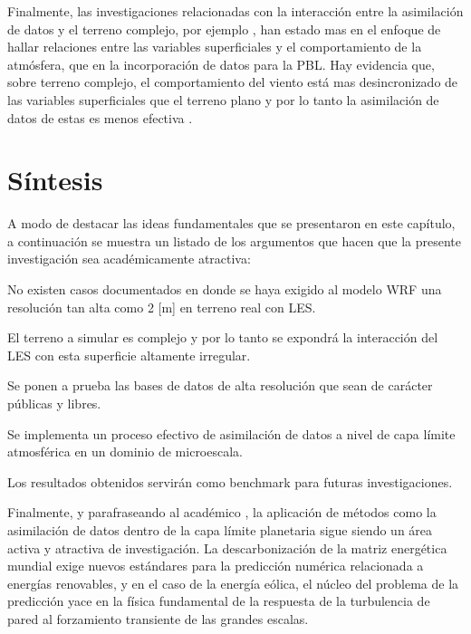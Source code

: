 Finalmente, las investigaciones relacionadas con la interacción entre la asimilación de datos y el terreno complejo, por ejemplo  \cite{hacker2018challenges}, han estado mas en el enfoque de hallar relaciones entre las variables superficiales y el comportamiento de la atmósfera, que en la incorporación de datos para la PBL. Hay evidencia que, sobre terreno complejo, el comportamiento del viento está mas desincronizado de las variables superficiales que el terreno plano y por lo tanto la asimilación de datos de estas es menos efectiva \cite{hacker2018challenges}.
\newpage
\section{Síntesis}
A modo de destacar las ideas fundamentales que se presentaron en este capítulo, a continuación se muestra un listado de los argumentos que hacen que la presente investigación sea académicamente atractiva:
\begin{enumerate*}
	\item No existen casos documentados en donde se haya exigido al modelo WRF una resolución tan alta como 2 [m] en terreno real con LES.
	\item El terreno a simular es complejo y por lo tanto se expondrá la interacción del LES con esta superficie altamente irregular.
	\item Se ponen a prueba las bases de datos de alta resolución que sean de carácter públicas y libres.
	\item Se implementa un proceso efectivo de asimilación de datos a nivel de capa límite atmosférica en un dominio de microescala.
	\item Los resultados obtenidos servirán como benchmark para futuras investigaciones.
\end{enumerate*}

Finalmente, y parafraseando al académico \cite{doi:10.1080/14685248.2019.1584664}, la aplicación de métodos como la asimilación de datos dentro de la capa límite planetaria sigue siendo un área activa y atractiva de investigación. La descarbonización de la matriz energética mundial exige nuevos estándares para la predicción numérica relacionada a energías renovables, y en el caso de la energía eólica, el núcleo del problema de la predicción yace en la física fundamental de la respuesta de la turbulencia de pared al forzamiento transiente de las grandes escalas.

